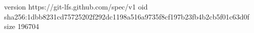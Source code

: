version https://git-lfs.github.com/spec/v1
oid sha256:1dbb8231cd75725202f292dc1198a516a9735f8cf197b23fb4b2cb5f01c63d0f
size 196704
